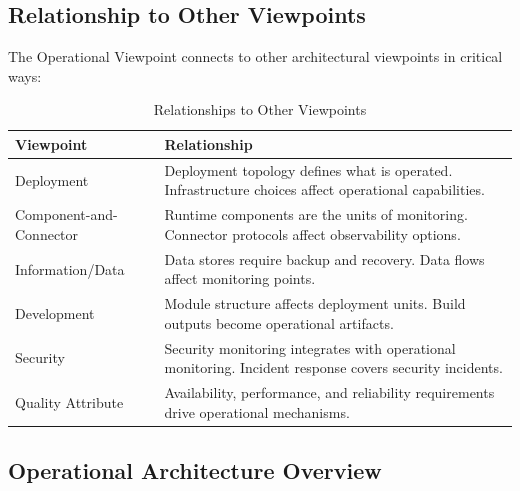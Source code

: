 \documentclass[11pt,letterpaper]{article}
\begin{document}
\subsection{Relationship to Other Viewpoints}

The Operational Viewpoint connects to other architectural viewpoints in critical ways:

\begin{table}[H]
\centering
\caption{Relationships to Other Viewpoints}
\begin{tabular}{@{}L{3.5cm}L{10.5cm}@{}}
\toprule
\textbf{Viewpoint} & \textbf{Relationship} \\
\midrule
Deployment & Deployment topology defines what is operated. Infrastructure choices affect operational capabilities. \\
\addlinespace
Component-and-Connector & Runtime components are the units of monitoring. Connector protocols affect observability options. \\
\addlinespace
Information/Data & Data stores require backup and recovery. Data flows affect monitoring points. \\
\addlinespace
Development & Module structure affects deployment units. Build outputs become operational artifacts. \\
\addlinespace
Security & Security monitoring integrates with operational monitoring. Incident response covers security incidents. \\
\addlinespace
Quality Attribute & Availability, performance, and reliability requirements drive operational mechanisms. \\
\bottomrule
\end{tabular}
\end{table}

\subsection{Operational Architecture Overview}
\end{document}
